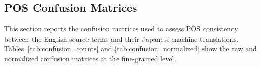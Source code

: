 \subsection{POS Confusion Matrices}
\label{appendix:confusion_matrices}

This section reports the confusion matrices used to assess POS consistency between the English source terms and their Japanese machine translations.
Tables~\ref{tab:confusion_counts} and \ref{tab:confusion_normalized} show the raw and normalized confusion matrices at the fine-grained level.

\begin{table}[h]
\centering
\caption{POS Confusion Matrix (Raw Count) (DeepL Translations)}
\label{tab:confusion_counts}
\small
{}
\end{table}


